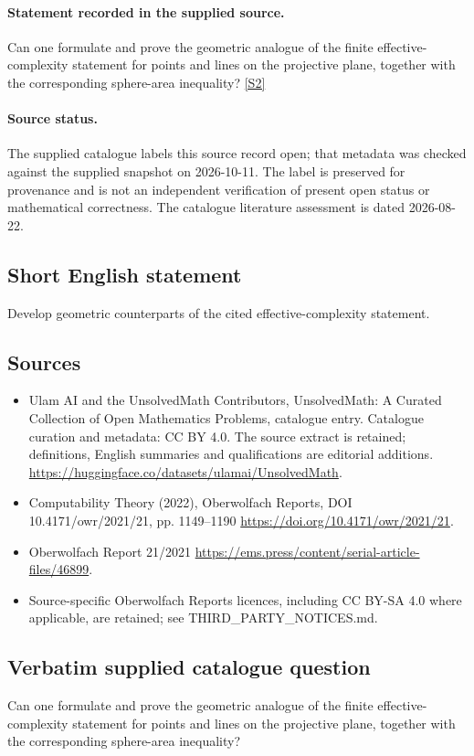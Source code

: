 \documentclass[11pt]{article}
\begin{document}
\paragraph{Statement recorded in the supplied source.}
Can one formulate and prove the geometric analogue of the finite effective-complexity statement for points and lines on the projective plane, together with the corresponding sphere-area inequality? \href{https://doi.org/10.4171/owr/2021/21}{[S2]}
\paragraph{Source status.}
The supplied catalogue labels this source record open; that metadata was checked against the supplied snapshot on 2026-10-11. The label is preserved for provenance and is not an independent verification of present open status or mathematical correctness. The catalogue literature assessment is dated 2026-08-22.
\subsection{Short English statement}
Develop geometric counterparts of the cited effective-complexity statement.
\subsection{Sources}
\begin{itemize}
\item[S1] Ulam AI and the UnsolvedMath Contributors, UnsolvedMath: A Curated Collection of Open Mathematics Problems, catalogue entry. Catalogue curation and metadata: CC BY 4.0. The source extract is retained; definitions, English summaries and qualifications are editorial additions.
\url{https://huggingface.co/datasets/ulamai/UnsolvedMath}.
\item[S2] Computability Theory (2022), Oberwolfach Reports, DOI 10.4171/owr/2021/21, pp. 1149--1190
\url{https://doi.org/10.4171/owr/2021/21}.
\item[S3] Oberwolfach Report 21/2021
\url{https://ems.press/content/serial-article-files/46899}.
\item Source-specific Oberwolfach Reports licences, including CC BY-SA 4.0 where applicable, are retained; see THIRD\_PARTY\_NOTICES.md.
\end{itemize}
\subsection{Verbatim supplied catalogue question}
Can one formulate and prove the geometric analogue of the finite effective-complexity statement for points and lines on the projective plane, together with the corresponding sphere-area inequality?
\end{document}
